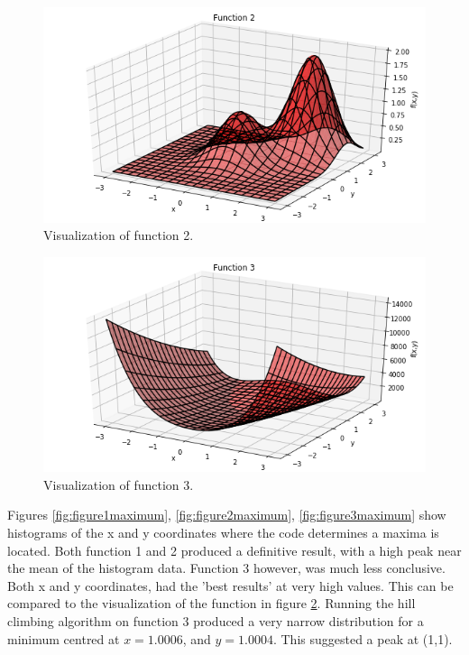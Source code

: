 \documentclass[twocolumn]{article}
\begin{document}
\begin{figure}
	\centering
	\includegraphics[width=\linewidth]{"function 2"}
	\caption{Visualization of function 2.}
	\label{fig:function2}
\end{figure}

\begin{figure}
	\centering
	\includegraphics[width=\linewidth]{"function 3"}
	\caption{Visualization of function 3.}
	\label{fig:function3}
\end{figure}

Figures \ref{fig:figure1maximum}, \ref{fig:figure2maximum}, \ref{fig:figure3maximum} show histograms of the x and y coordinates where the code determines a maxima is located. Both function 1 and 2 produced a definitive result, with a high peak near the mean of the histogram data. Function 3 however, was much less conclusive. Both x and y coordinates, had the 'best results' at very high values. This can be compared to the visualization of the function in figure \ref{fig:function3}. Running the hill climbing algorithm on function 3 produced a very narrow distribution for a minimum centred at $x=1.0006$, and $y=1.0004$. This suggested a peak at (1,1). 
\end{document}
